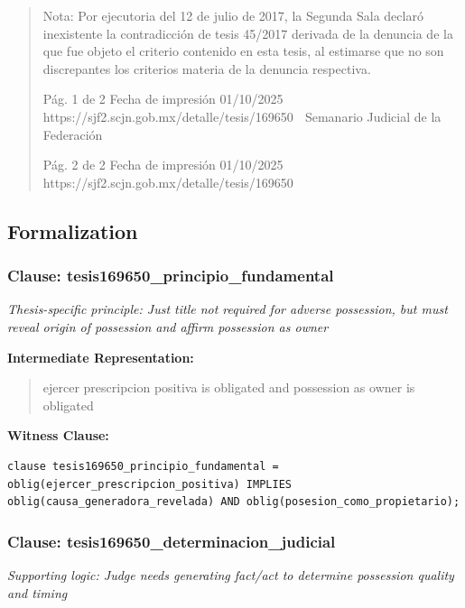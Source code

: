 \documentclass[11pt,a4paper]{article}
\begin{document}
\begin{quote}
Nota: Por ejecutoria del 12 de julio de 2017, la Segunda Sala declaró inexistente la contradicción de
tesis 45/2017 derivada de la denuncia de la que fue objeto el criterio contenido en esta tesis, al
estimarse que no son discrepantes los criterios materia de la denuncia respectiva.




                                               Pág. 1 de 2              Fecha de impresión 01/10/2025
  https://sjf2.scjn.gob.mx/detalle/tesis/169650
                                                Semanario Judicial de la Federación




                                           Pág. 2 de 2       Fecha de impresión 01/10/2025
https://sjf2.scjn.gob.mx/detalle/tesis/169650

\end{quote}

\subsection{Formalization}

\subsubsection{Clause: tesis169650\_principio\_fundamental}

\textit{Thesis-specific principle: Just title not required for adverse possession, but must reveal origin of possession and affirm possession as owner}

\textbf{Intermediate Representation:}

\begin{quote}
ejercer prescripcion positiva is obligated and possession as owner is obligated
\end{quote}

\textbf{Witness Clause:}

\begin{lstlisting}[style=witnessstyle, language=Witness]
clause tesis169650_principio_fundamental = oblig(ejercer_prescripcion_positiva) IMPLIES oblig(causa_generadora_revelada) AND oblig(posesion_como_propietario);
\end{lstlisting}

\subsubsection{Clause: tesis169650\_determinacion\_judicial}

\textit{Supporting logic: Judge needs generating fact/act to determine possession quality and timing}
\end{document}
